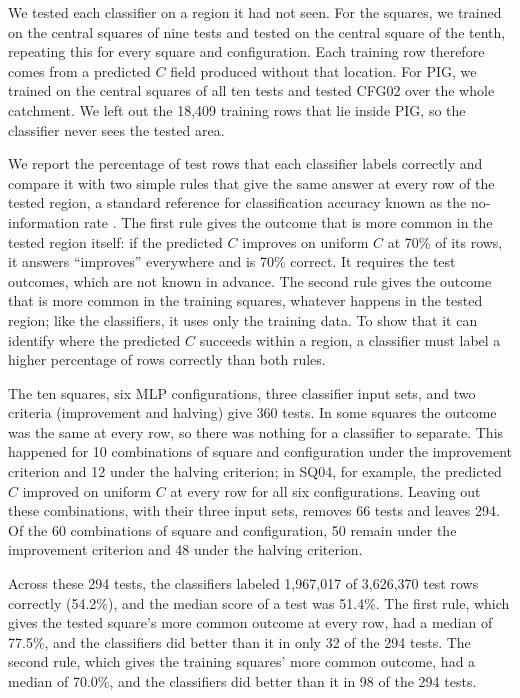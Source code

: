 \documentclass[review,jog]{igs}
\begin{document}
We tested each classifier on a region it had not seen. For the squares, we
trained on the central squares of nine tests and tested on the central square
of the tenth, repeating this for every square and configuration. Each training
row therefore comes from a predicted $C$ field produced without that location. For PIG, we trained on the central
squares of all ten tests and tested CFG02 over the whole catchment. We left out
the 18,409 training rows that lie inside PIG, so the classifier never sees the
tested area.

We report the percentage of test rows that each classifier labels correctly
and compare it with two simple rules that give the same answer at every row of
the tested region, a standard reference for classification accuracy known as
the no-information rate \citep[Chapter~11]{kuhn2013applied}. The first rule
gives the outcome that is more common in the tested region itself: if the
predicted $C$ improves on uniform $C$ at 70\% of its rows, it answers
``improves'' everywhere and is 70\% correct. It requires the test outcomes,
which are not known in advance. The second
rule gives the outcome that is more common in the training squares, whatever
happens in the tested region; like the classifiers, it uses only the training
data. To show that it can identify where the predicted $C$ succeeds within a region, a classifier must label a higher percentage of rows correctly than both rules.

The ten squares, six MLP configurations, three classifier input sets, and two
criteria (improvement and halving) give 360 tests. In some squares the outcome was the same at every
row, so there was nothing for a classifier to separate. This happened for 10
combinations of square and configuration under the improvement criterion and
12 under the halving criterion; in SQ04, for example, the predicted $C$
improved on uniform $C$ at every row for all six configurations. Leaving out
these combinations, with their three input sets, removes 66 tests and leaves
294. Of the 60 combinations of square and configuration, 50 remain under the
improvement criterion and 48 under the halving criterion.

Across these 294 tests, the classifiers labeled 1,967,017 of 3,626,370 test
rows correctly (54.2\%), and the median score of a test was 51.4\%. The first
rule, which gives the tested square's more common outcome at every row, had a
median of 77.5\%, and the classifiers did better than it in only 32 of the 294
tests. The second rule, which gives the training squares' more common outcome,
had a median of 70.0\%, and the classifiers did better than it in 98 of the 294
tests.
\end{document}
